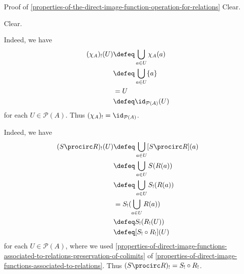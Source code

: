 \begin{Proof}{Proof of \cref{properties-of-the-direct-image-function-operation-for-relations}}%
    Clear.

    Clear.

    Indeed, we have
    \begin{align*}
        (\chi_{A})_{!}(U) &\defeq \bigcup_{a\in U}\chi_{A}(a)\\
                          &\defeq \bigcup_{a\in U}\{a\}\\
                          &=      U\\
                          &\defeq \id_{\mathcal{P}(A)}(U)
    \end{align*}
    for each $U\in\mathcal{P}(A)$. Thus $(\chi_{A})_{!}=\id_{\mathcal{P}(A)}$.

    Indeed, we have
    \begin{align*}
        (S\procirc R)_{!}(U) &\defeq \bigcup_{a\in U}[S\procirc R](a)\\
                             &\defeq \bigcup_{a\in U}S(R(a))\\
                             &\defeq \bigcup_{a\in U}S_{!}(R(a))\\
                             &=      S_{!}(\bigcup_{a\in U}R(a))\\
                             &\defeq S_{!}(R_{!}(U))\\
                             &\defeq [S_{!}\circ R_{!}](U)
    \end{align*}
    for each $U\in\mathcal{P}(A)$, where we used \cref{properties-of-direct-image-functions-associated-to-relations-preservation-of-colimits} of \cref{properties-of-direct-image-functions-associated-to-relations}. Thus $(S\procirc R)_{!}=S_{!}\circ R_{!}$.
\end{Proof}
